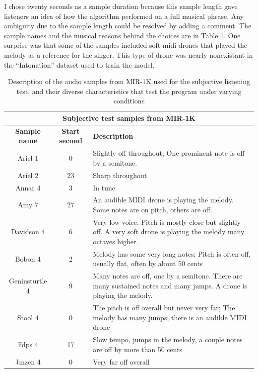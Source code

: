 I chose twenty seconds as a sample duration because this sample length gave listeners an idea of how the algorithm performed on a full musical phrase. Any ambiguity due to the sample length could be resolved by adding a comment. The sample names and the musical reasons behind the choices are in Table \ref{table:audio-samples}. One surprise was that some of the samples included soft \gls{midi} drones that played the melody as a reference for the singer. This type of drone was nearly nonexistant in the ``Intonation'' dataset used to train the model.

\begin{table}
\centering
\begin{tabularx}{\columnwidth}{ |c|c|X| } 
\hline
\multicolumn{3}{|c|}{\textbf{Subjective test samples from MIR-1K}}\\
\hline\hline
\textbf{Sample name} & \textbf{Start second} & \textbf{Description} \\
\hline\hline
Ariel 1 & 0 & Slightly off throughout; One prominent note is off by a semitone.\\
\hline
Ariel 2 & 23 & Sharp throughout\\ 
\hline
Annar 4 & 3 & In tune\\ 
\hline
Amy 7 & 27 & An audible MIDI drone is playing the melody. Some notes are on pitch, others are off. \\
\hline
Davidson 4 & 6 & Very low voice. Pitch is mostly close but slightly off. A very soft drone is playing the melody many octaves higher. \\ 
\hline
Bobon 4 & 2 & Melody has some very long notes; Pitch is often off, usually flat, often by about 50 cents\\ 
\hline
Geniusturtle 4 & 9 & Many notes are off, one by a semitone. There are many sustained notes and many jumps. A drone is playing the melody.\\ 
\hline
Stool 4 & 0 & The pitch is off overall but never very far; The melody has many jumps; there is an audible MIDI drone\\ 
\hline
Fdps 4 & 17 & Slow tempo, jumps in the melody, a couple notes are off by more than 50 cents\\ 
\hline
Jmzen 4 & 0 & Very far off overall\\ 
\hline
\end{tabularx}
\label{table:audio-samples}
\caption{Description of the audio samples from MIR-1K used for the subjective listening test, and their diverse characteristics that test the program under varying conditions}
\end{table}

